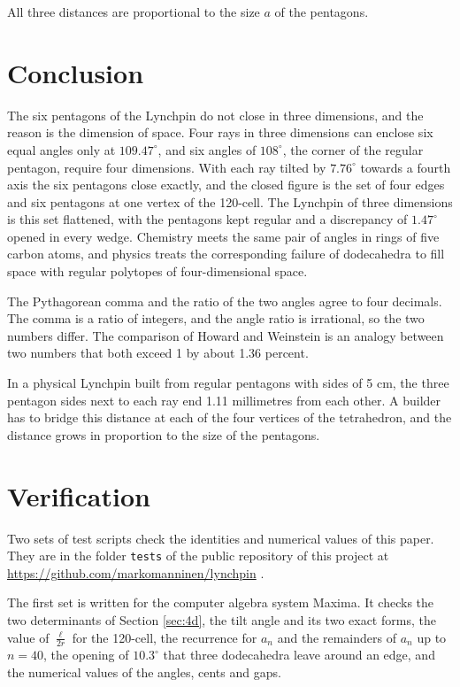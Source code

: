 \documentclass[a4paper,12pt]{article}
\begin{document}
All three distances are proportional to the size \( a \) of the pentagons.


\section{Conclusion}
The six pentagons of the Lynchpin do not close in three dimensions, and the reason is the dimension of space. Four rays in three dimensions can enclose six equal angles only at \( 109.47^\circ \), and six angles of \( 108^\circ \), the corner of the regular pentagon, require four dimensions. With each ray tilted by \( 7.76^\circ \) towards a fourth axis the six pentagons close exactly, and the closed figure is the set of four edges and six pentagons at one vertex of the 120-cell. The Lynchpin of three dimensions is this set flattened, with the pentagons kept regular and a discrepancy of \( 1.47^\circ \) opened in every wedge. Chemistry meets the same pair of angles in rings of five carbon atoms, and physics treats the corresponding failure of dodecahedra to fill space with regular polytopes of four-dimensional space.

The Pythagorean comma and the ratio of the two angles agree to four decimals. The comma is a ratio of integers, and the angle ratio is irrational, so the two numbers differ. The comparison of Howard and Weinstein is an analogy between two numbers that both exceed 1 by about 1.36 percent.

In a physical Lynchpin built from regular pentagons with sides of 5 cm, the three pentagon sides next to each ray end 1.11 millimetres from each other. A builder has to bridge this distance at each of the four vertices of the tetrahedron, and the distance grows in proportion to the size of the pentagons.


\section{Verification}
\label{sec:verification}
Two sets of test scripts check the identities and numerical values of this paper. They are in the folder \texttt{tests} of the public repository of this project at \url{https://github.com/markomanninen/lynchpin} \cite{3d-model}.

The first set is written for the computer algebra system Maxima. It checks the two determinants of Section \ref{sec:4d}, the tilt angle and its two exact forms, the value of \( \frac{\ell}{2r} \) for the 120-cell, the recurrence for \( a_n \) and the remainders of \( a_n \) up to \( n = 40 \), the opening of \( 10.3^\circ \) that three dodecahedra leave around an edge, and the numerical values of the angles, cents and gaps.
\end{document}
